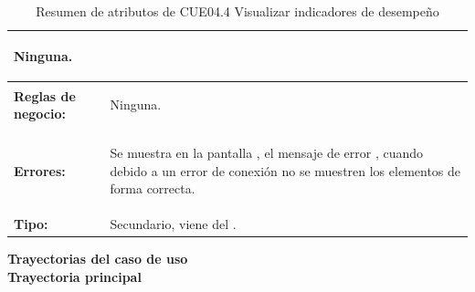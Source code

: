 \begin{table}[H]
\begin{tabular}{| l | p{12 cm} |}
							\begin{compactitem}
								\item Ninguna.
							\end{compactitem}\\	
\hline
\textbf{Reglas de negocio:} & \vspace{-2mm}	%
							\begin{compactitem}
								\item Ninguna.
							\end{compactitem}\\							
\hline
\textbf{Errores:} &	\vspace{-2mm}	%
					\begin{compactitem}
						\setlength\itemsep{-0.25em}
						\item Se muestra en la pantalla \nameref{pant:IUE04}, el mensaje de error \nameref{msj:MSG24}, cuando debido a un error de conexión no se muestren los elementos de forma correcta.
					\end{compactitem}\\
\hline
\textbf{Tipo:} & Secundario, viene del \nameref{cu:CUE04}.\\
\hline
\end{tabular}
\caption{Resumen de atributos de CUE04.4 Visualizar indicadores de desempeño}
\label{tab:CUE04.4}
\end{table} 


\textbf{\textcolor[rgb]{0, 0, 0.545098}{Trayectorias del caso de uso}} \\

\textbf{\large{Trayectoria principal}}

